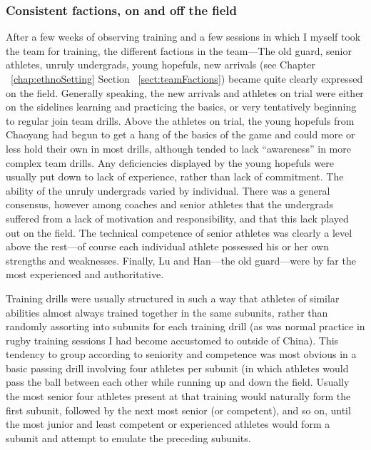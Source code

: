 \begin{CJK}{UTF8}{gbsn}
\subsubsection{Consistent factions, on and off the field}
After a few weeks of observing training and a few sessions in which I myself took the team for training, the different factions in the team---The old guard, senior athletes, unruly undergrads, young hopefuls, new arrivals (see Chapter ~\ref{chap:ethnoSetting} Section ~\ref{sect:teamFactions}) became quite clearly expressed on the field.  Generally speaking, the new arrivals and athletes on trial were either on the sidelines learning and practicing the basics, or very tentatively beginning to regular join team drills. Above the athletes on trial, the young hopefuls from Chaoyang had begun to get a hang of the basics of the game and could more or less hold their own in most drills, although tended to lack ``awareness'' in more complex team drills.  Any deficiencies displayed by the young hopefuls were usually put down to lack of experience, rather than lack of commitment.  The ability of the unruly undergrads varied by individual. There was a general consensus, however among coaches and senior athletes that the undergrads suffered from a lack of motivation and responsibility, and that this lack played out on the field.  The technical competence of senior athletes was clearly a level above the rest---of course each individual athlete possessed his or her own strengths and weaknesses.  Finally, Lu and Han---the old guard---were by far the most experienced and authoritative.

Training drills were usually structured in such a way that athletes of similar abilities almost always trained together in the same subunits, rather than randomly assorting into subunits for each training drill (as was normal practice in rugby training sessions I had become accustomed to outside of China).  This tendency to group according to seniority and competence was most obvious in a basic passing drill involving four athletes per subunit (in which athletes would pass the ball between each other while running up and down the field.  Usually the most senior four athletes present at that training would naturally form the first subunit, followed by the next most senior (or competent), and so on, until the most junior and least competent or experienced athletes would form a subunit and attempt to emulate the preceding subunits.


\end{CJK}
